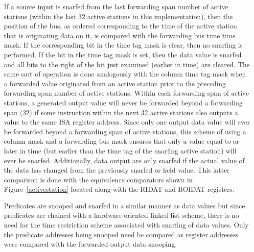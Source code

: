 If a source input is snarfed from the last forwarding span number of
active stations (within the last 32 active stations in this
implementation), then the position of the bus, as ordered corresponding
to the time of the active station that is originating data on it, is
compared with the forwarding bus time time mask.  If the corresponding
bit in the time tag mask is clear, then no snarfing is performed.  If
the bit in the time tag mask is set, then the data value is snarfed and
all bits to the right of the bit just examined (earlier in time) are
cleared.  The same sort of operation is done analogously with the
column time tag mask when a forwarded value originated from an active
station prior to the preceding forwarding span number of active
stations.  Within each forwarding span of active stations, a generated
output value will never be forwarded beyond a forwarding span (32) if
some instruction within the next 32 active stations also outputs a
value to the same ISA register address.  Since only one output data
value will ever be forwarded beyond a forwarding span of active
stations, this scheme of using a column mask and a forwarding bus mask
ensures that only a value equal to or later in time (but earlier than
the time tag of the snarfing active station) will ever be snarfed.
Additionally, data output are only snarfed if the actual value of the
data has changed from the previously snarfed or held value.  This
latter comparison is done with the equivalence comparators shown in
Figure~\ref{activestation} located along with the RIDAT and ROIDAT
registers.

Predicates are snooped and snarfed in a similar manner as data values
but since predicates are chained with a hardware oriented linked-list
scheme, there is no need for the time restriction scheme associated
with snarfing of data values.  Only the predicate addresses being
snooped need be compared as register addresses were compared with the
forwarded output data snooping.

